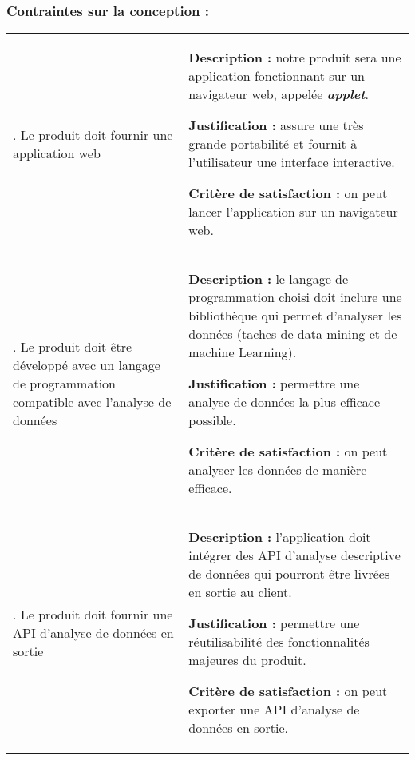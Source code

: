 			\subsubsection{Contraintes sur la conception :}
				\begin{center}\begin{longtable}{|>{\centering}m{3cm}|>{\raggedright\arraybackslash}m{10cm}|}			
				\hline \multicolumn{1}{|c}{\textbf{Contrainte}} & \multicolumn{1}{|c|}{\textbf{Fiche}} \\
				\hline 	1. Le produit doit fournir une application web &
						\begin{description}[style=unboxed,leftmargin=0.2cm]
						\item{\textbf{Description :}} notre produit sera une application fonctionnant sur un navigateur web, appelée \textbf{\textit{applet}}.
						\item{\textbf{Justification :}} assure une très grande portabilité et fournit à l'utilisateur une interface interactive.
						\item{\textbf{Critère de satisfaction :}} on peut lancer l'application sur un navigateur web.
						\end{description}\\
				\hline 2. Le produit doit être développé avec un langage de programmation compatible avec l'analyse de données &
						\begin{description}[style=unboxed,leftmargin=0.2cm]
						\item{\textbf{Description :}} le langage de programmation choisi doit inclure une bibliothèque qui permet d'analyser les données (taches de data mining et de machine Learning).
						\item{\textbf{Justification :}} permettre une analyse de données la plus efficace possible.
						\item{\textbf{Critère de satisfaction :}} on peut analyser les données de manière efficace.
						\end{description}\\
				\hline 3. Le produit doit fournir une API d'analyse de données en sortie &
						\begin{description}[style=unboxed,leftmargin=0.2cm]
						\item{\textbf{Description :}} l'application doit intégrer des API d'analyse descriptive de données qui pourront être livrées en sortie au client.
						\item{\textbf{Justification :}} permettre une réutilisabilité des fonctionnalités majeures du produit.
						\item{\textbf{Critère de satisfaction :}} on peut exporter une API d'analyse de données en sortie.
						\end{description}\\
				\hline
				\end{longtable}\vspace{1em}\end{center}
				
